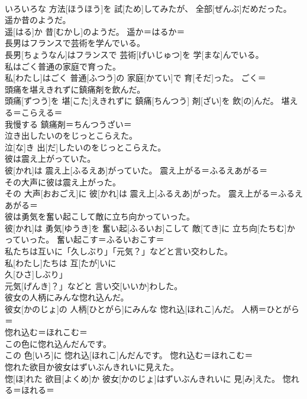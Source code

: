 \documentclass[8pt]{extreport}
\begin{document}
\begin{CJK}{UTF8}{min}
\\	いろいろな 方法[ほうほう]を 試[ため]してみたが、 全部[ぜんぶ]だめだった。	
\\	遥か昔のようだ。	
\\	遥[はる]か 昔[むかし]のようだ。	遥か＝はるか＝ 
\\	長男はフランスで芸術を学んでいる。	
\\	長男[ちょうなん]はフランスで 芸術[げいじゅつ]を 学[まな]んでいる。	
\\	私はごく普通の家庭で育った。	
\\	私[わたし]はごく 普通[ふつう]の 家庭[かてい]で 育[そだ]った。	ごく＝ 
\\	頭痛を堪えきれずに鎮痛剤を飲んだ。	
\\	頭痛[ずつう]を 堪[こた]えきれずに 鎮痛[ちんつう] 剤[ざい]を 飲[の]んだ。	堪える＝こらえる＝ 
\\	我慢する 鎮痛剤＝ちんつうざい＝ 
\\	泣き出したいのをじっとこらえた。	
\\	泣[な]き 出[だ]したいのをじっとこらえた。	
\\	彼は震え上がっていた。	
\\	彼[かれ]は 震え上[ふるえあ]がっていた。	震え上がる＝ふるえあがる＝ 
\\	その大声に彼は震え上がった。	
\\	その 大声[おおごえ]に 彼[かれ]は 震え上[ふるえあ]がった。	震え上がる＝ふるえあがる＝ 
\\	彼は勇気を奮い起こして敵に立ち向かっていった。	
\\	彼[かれ]は 勇気[ゆうき]を 奮い起[ふるいお]こして 敵[てき]に 立ち向[たちむ]かっていった。	奮い起こす＝ふるいおこす＝ 
\\	私たちは互いに「久しぶり」「元気？」などと言い交わした。	
\\	私[わたし]たちは 互[たが]いに
\\	久[ひさ]しぶり」
\\	元気[げんき]？」などと 言い交[いいか]わした。	
\\	彼女の人柄にみんな惚れ込んだ。	
\\	彼女[かのじょ]の 人柄[ひとがら]にみんな 惚れ込[ほれこ]んだ。	人柄＝ひとがら＝ 
\\	惚れ込む＝ほれこむ＝ 
\\	この色に惚れ込んだんです。	
\\	この 色[いろ]に 惚れ込[ほれこ]んだんです。	惚れ込む＝ほれこむ＝ 
\\	惚れた欲目か彼女はずいぶんきれいに見えた。	
\\	惚[ほ]れた 欲目[よくめ]か 彼女[かのじょ]はずいぶんきれいに 見[み]えた。	惚れる＝ほれる＝ 

\end{CJK}
\end{document}
